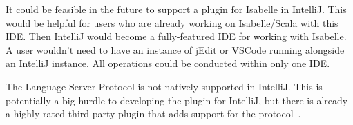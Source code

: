 It could be feasible in the future to support a plugin for Isabelle in IntelliJ. This would be helpful for users who are already working on Isabelle/Scala with this IDE. Then IntelliJ would become a fully-featured IDE for working with Isabelle. A user wouldn't need to have an instance of jEdit or VSCode running alongside an IntelliJ instance. All operations could be conducted within only one IDE.

The Language Server Protocol is not natively supported in IntelliJ. This is potentially a big hurdle to developing the plugin for IntelliJ, but there is already a highly rated third-party plugin that adds support for the protocol~\parencite{intellij_lsp}.